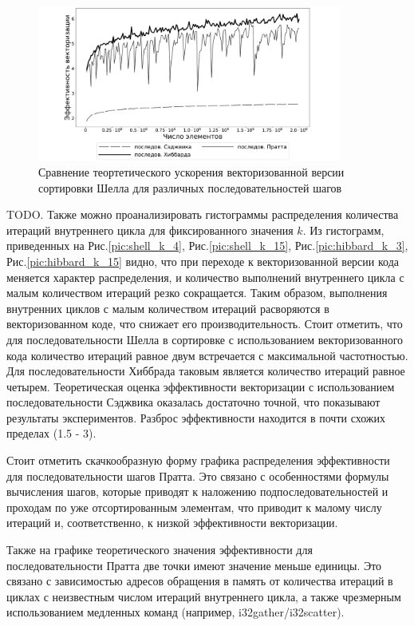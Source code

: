 \documentclass[utf8]{psta}
\begin{document}
\begin{figure}
\includegraphics[width=10cm]{pics/theoretical_eff}
\caption{Сравнение теортетического ускорения векторизованной версии сортировки Шелла для различных последовательностей шагов}
\label{pic:acc_exp}
\end{figure}


TODO.
Также можно проанализировать гистограммы распределения количества итераций внутреннего цикла для фиксированного значения $k$. Из гистограмм, приведенных на Рис.\ref{pic:shell_k_4}, Рис.\ref{pic:shell_k_15}, Рис.\ref{pic:hibbard_k_3}, Рис.\ref{pic:hibbard_k_15} видно, что при переходе к векторизованной версии кода меняется характер распределения, и количество выполнений внутреннего цикла с малым количеством итераций резко сокращается. Таким образом, выполнения внутренних циклов с малым количеством итераций расворяются в векторизованном коде, что снижает его производительность.
Стоит отметить, что для последовательности Шелла в сортировке с использованием векторизованного кода количество итераций равное двум встречается с максимальной частотностью. 
Для последовательности Хиббрада таковым является количество итераций равное четырем.
Теоретическая оценка эффективности векторизации с использованием  последовательности Сэджвика оказалась достаточно точной, что показывают результаты экспериментов. Разброс эффективности находится в почти схожих пределах (1.5 - 3).

Стоит отметить скачкообразную форму графика распределения эффективности для последовательности шагов Пратта. 
Это связано с особенностями формулы вычисления шагов, которые приводят к наложению подпоследовательностей и проходам по уже отсортированным элементам, что приводит к малому числу итераций и, соответственно, к низкой эффективности векторизации.

Также на графике теоретического значения эффективности для последовательности Пратта две точки имеют значение меньше единицы. 
Это связано с зависимостью адресов обращения в память от количества итераций в циклах с неизвестным числом итераций внутреннего цикла, а также чрезмерным использованием медленных команд (например, i32gather/i32scatter).
\end{document}
